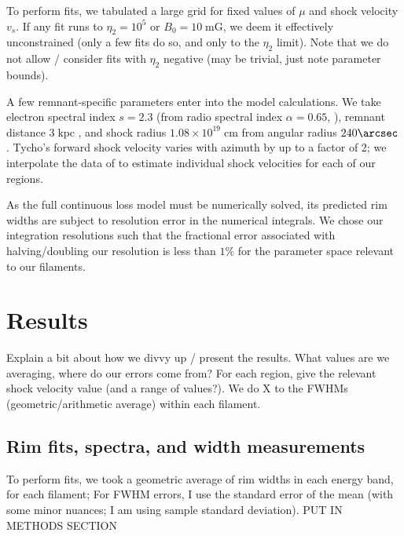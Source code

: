 \documentclass[12pt,preprint]{aastex}  %
\newcommand*{\mt}{\mathrm}
\newcommand*{\unit}[1]{\;\mt{#1}}  %
\begin{document}
To perform fits, we tabulated a large grid for fixed values of $\mu$ and shock
velocity $v_s$.  If any fit runs to $\eta_2 = 10^5$ or $B_0 = 10 \unit{mG}$,
we deem it effectively unconstrained (only a few fits do so, and only to the
$\eta_2$ limit).
Note that we do not allow / consider fits with $\eta_2$ negative (may be
trivial, just note parameter bounds).

A few remnant-specific parameters enter into the model calculations.  We take
electron spectral index $s = 2.3$ (from radio spectral index $\alpha = 0.65$,
\citet{kothes2006} ),
remnant distance $3 \unit{kpc}$ \citep[cf.][]{hayato2010}, and
shock radius $1.08 \times 10^{19} \unit{cm}$ from angular radius $240\arcsec$
\citep{green2009}.  Tycho's forward shock velocity varies with azimuth by up to
a factor of 2; we interpolate the data of \citet{williams2013} to estimate
individual shock velocities for each of our regions.

As the full continuous loss model must be numerically solved, its predicted
rim widths are subject to resolution error in the numerical integrals.  We
chose our integration resolutions such that the fractional error associated
with halving/doubling our resolution is less than $1\%$ for the
parameter space relevant to our filaments. 

\section{Results}

Explain a bit about how we divvy up / present the results.  What values are we
averaging, where do our errors come from?
For each region, give the relevant shock velocity value (and a range of
values?).
We do X to the FWHMs (geometric/arithmetic average) within each filament.

\subsection{Rim fits, spectra, and width measurements}

To perform fits, we took a geometric average of rim widths in each energy band,
for each filament;
For FWHM errors, I use the standard error of the mean (with some
minor nuances; I am using sample standard deviation).
PUT IN METHODS SECTION
\end{document}
